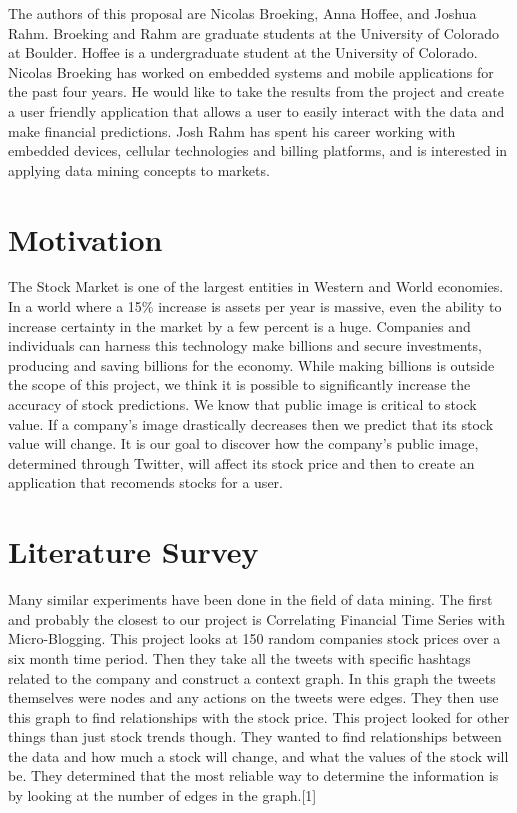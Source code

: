 \documentclass{acm_proc_article-sp}
\begin{document}
The authors of this proposal are Nicolas Broeking, Anna
Hoffee, and Joshua Rahm. Broeking and Rahm are graduate students at the
University of Colorado at Boulder. Hoffee is a undergraduate student at the
University of Colorado. Nicolas Broeking has worked on embedded systems and
mobile applications for the past four years. He would like to take the results
from the project and create a user friendly application that allows a user to
easily interact with the data and make financial predictions.  Josh Rahm has
spent his career working with embedded devices, cellular technologies and
billing platforms, and is interested in applying data mining concepts to
markets.  

\section{Motivation}

The Stock Market is one of the largest entities in Western and World economies.
In a world where a 15\% increase is assets per year is massive,  even the
ability to increase certainty in the market by a few percent is a huge.
Companies and individuals can harness this technology make billions and secure
investments, producing and saving billions for the economy. While making
billions is outside the scope of this project, we think it is possible to
significantly increase the accuracy of stock predictions. We know that public
image is critical to stock value. If a company's image drastically decreases
then we predict that its stock value will change. It is our goal to discover
how the company's public image, determined through Twitter, will affect its
stock price and then to create an application that recomends stocks for a user.

\section{Literature Survey}

Many similar experiments have been done in the
field of data mining. The first and probably the closest to our project is
Correlating Financial Time Series with Micro-Blogging. This project looks at
150 random companies stock prices over a six month time period. Then they take
all the tweets with specific hashtags related to the company and construct a
context graph. In this graph the tweets themselves were nodes and any actions
on the tweets were edges. They then use this graph to find relationships with
the stock price. This project looked for other things than just stock trends
though. They wanted to find relationships between the data and how much a stock
will change, and what the values of the stock will be. They determined that the
most reliable way to determine the information is by looking at the number of
edges in the graph.[1] 
\end{document}
